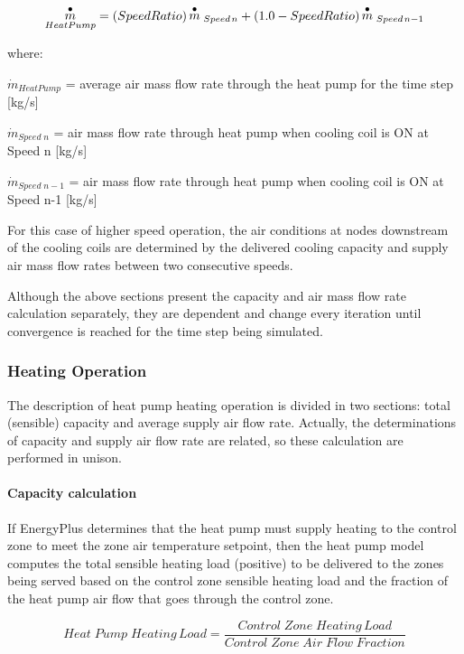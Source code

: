 \begin{equation}
{\mathop m\limits^ \bullet_{HeatPump}} = (SpeedRatio)\mathop m\limits^ \bullet  {{\kern 1pt}_{Speed{\kern 1pt} n}} + (1.0 - SpeedRatio)\mathop m\limits^ \bullet  {{\kern 1pt}_{Speed{\kern 1pt} n - 1}}
\end{equation}

where:

\({\dot m_{HeatPump}}\) = average air mass flow rate through the heat pump for the time step {[}kg/s{]}

\({\dot m_{Speed\;n}}\) = air mass flow rate through heat pump when cooling coil is ON at Speed n {[}kg/s{]}

\({\dot m_{Speed\;n - 1}}\) = air mass flow rate through heat pump when cooling coil is ON at Speed n-1 {[}kg/s{]}

For this case of higher speed operation, the air conditions at nodes downstream of the cooling coils are determined by the delivered cooling capacity and supply air mass flow rates between two consecutive speeds.

Although the above sections present the capacity and air mass flow rate calculation separately, they are dependent and change every iteration until convergence is reached for the time step being simulated.

\subsubsection{Heating Operation}\label{heating-operation-1}

The description of heat pump heating operation is divided in two sections: total (sensible) capacity and average supply air flow rate. Actually, the determinations of capacity and supply air flow rate are related, so these calculation are performed in unison.

\paragraph{Capacity calculation}\label{capacity-calculation-1}

If EnergyPlus determines that the heat pump must supply heating to the control zone to meet the zone air temperature setpoint, then the heat pump model computes the total sensible heating load (positive) to be delivered to the zones being served based on the control zone sensible heating load and the fraction of the heat pump air flow that goes through the control zone.

\begin{equation}
Heat\;Pump\;Heating\,Load = \frac{{Control\;Zone\;Heating\,Load}}{{Control\;Zone\;Air\;Flow\;Fraction}}
\end{equation}


